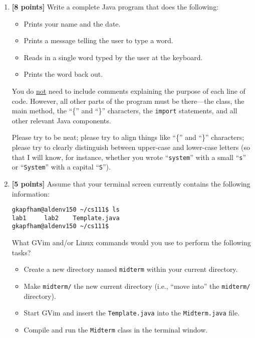 \documentclass[11pt]{report}
\begin{document}
\begin{enumerate}


\item {\bf [8 points]}
Write a complete Java program that does the following: 
\begin{itemize}
\setlength{\itemsep}{0pt}
\item Prints your name and the date. 
\item Prints a message telling the user to type a word. 
\item Reads in a single word typed by the user at the keyboard. 
\item Prints the word back out. 
\end{itemize}
You do \underline{not} need to include 
comments explaining the purpose of each line of code.
However, all other parts of the program must be
there---the class, the main method, the ``\{'' and ``\}'' characters,
the {\tt import} statements, and all other relevant Java components.

Please try to be neat; please try to align things like ``\{'' and ``\}''
characters; please try to clearly distinguish between upper-case and
lower-case letters (so that I will know, for instance, whether
you wrote ``{\tt system}'' with a small ``{\tt s}'' or ``{\tt System}''
with a capital ``{\tt S}'').

\vspace{1.5in}

\item {\bf [5 points]}
Assume that your terminal screen currently contains the following information:
\begin{center}
\begin{minipage}{3in}
\begin{verbatim}
gkapfham@aldenv150 ~/cs111$ ls
lab1     lab2    Template.java
gkapfham@aldenv150 ~/cs111$ 
\end{verbatim}
\end{minipage}
\end{center}

What GVim and/or Linux commands would you use to perform the following tasks? 
\begin{itemize}
\setlength{\itemsep}{0pt}
\item Create a new directory named {\tt midterm} within your current directory.
\item Make {\tt midterm/} the new current directory (i.e., ``move into'' the {\tt midterm/} directory).
\item Start GVim and insert the {\tt Template.java} into the {\tt Midterm.java} file.
\item Compile and run the {\tt Midterm} class in the terminal window.
\end{itemize}


\end{enumerate}
\end{document}

